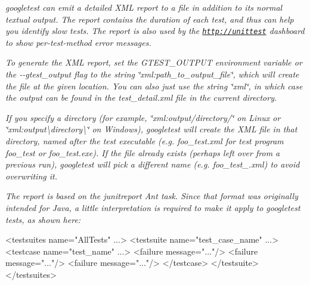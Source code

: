 {\itshape }

{\itshape googletest can emit a detailed X\+ML report to a file in addition to its normal textual output. The report contains the duration of each test, and thus can help you identify slow tests. The report is also used by the \href{http://unittest}{\tt http\+://unittest} dashboard to show per-\/test-\/method error messages.}

{\itshape To generate the X\+ML report, set the {\ttfamily G\+T\+E\+S\+T\+\_\+\+O\+U\+T\+P\+UT} environment variable or the {\ttfamily -\/-\/gtest\+\_\+output} flag to the string {\ttfamily \char`\"{}xml\+:path\+\_\+to\+\_\+output\+\_\+file\char`\"{}}, which will create the file at the given location. You can also just use the string {\ttfamily \char`\"{}xml\char`\"{}}, in which case the output can be found in the {\ttfamily test\+\_\+detail.\+xml} file in the current directory.}

{\itshape If you specify a directory (for example, {\ttfamily \char`\"{}xml\+:output/directory/\char`\"{}} on Linux or {\ttfamily \char`\"{}xml\+:output\textbackslash{}directory\textbackslash{}\char`\"{}} on Windows), googletest will create the X\+ML file in that directory, named after the test executable (e.\+g. {\ttfamily foo\+\_\+test.\+xml} for test program {\ttfamily foo\+\_\+test} or {\ttfamily foo\+\_\+test.\+exe}). If the file already exists (perhaps left over from a previous run), googletest will pick a different name (e.\+g. {\ttfamily foo\+\_\+test\+\_.\+xml}) to avoid overwriting it.}

{\itshape The report is based on the {\ttfamily junitreport} Ant task. Since that format was originally intended for Java, a little interpretation is required to make it apply to googletest tests, as shown here\+:}

{\itshape 
\begin{DoxyCode}
<\textcolor{keywordtype}{testsuites} \textcolor{keyword}{name}=\textcolor{stringliteral}{"AllTests"} ...>
  <\textcolor{keywordtype}{testsuite} \textcolor{keyword}{name}=\textcolor{stringliteral}{"test\_case\_name"} ...>
    <\textcolor{keywordtype}{testcase}    \textcolor{keyword}{name}=\textcolor{stringliteral}{"test\_name"} ...>
      <\textcolor{keywordtype}{failure} \textcolor{keyword}{message}=\textcolor{stringliteral}{"..."}/>
      <\textcolor{keywordtype}{failure} \textcolor{keyword}{message}=\textcolor{stringliteral}{"..."}/>
      <\textcolor{keywordtype}{failure} \textcolor{keyword}{message}=\textcolor{stringliteral}{"..."}/>
    </\textcolor{keywordtype}{testcase}>
  </\textcolor{keywordtype}{testsuite}>
</\textcolor{keywordtype}{testsuites}>
\end{DoxyCode}
}

